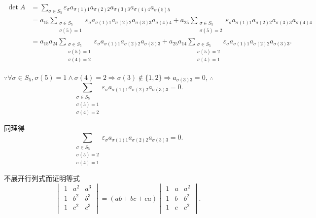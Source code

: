 \documentclass{ctexart}
\begin{document}
\begin{solution}
    \begin{align*}
        \det A & =\sum\limits_{\sigma\in S_5}\varepsilon_\sigma a_{\sigma(1)1}a_{\sigma(2)2}a_{\sigma(3)3}a_{\sigma(4)4}a_{\sigma(5)5} \\
        & =a_{15}\sum\limits_{\substack{\sigma\in S_5\\\sigma(5)=1}}\varepsilon_\sigma a_{\sigma(1)1}a_{\sigma(2)2}a_{\sigma(3)3}a_{\sigma(4)4}+a_{25}\sum\limits_{\substack{\sigma\in S_5\\\sigma(5)=2}}\varepsilon_\sigma a_{\sigma(1)1}a_{\sigma(2)2}a_{\sigma(3)3}a_{\sigma(4)4} \\
        & =a_{15}a_{24}\sum\limits_{\substack{\sigma\in S_5\\\sigma(5)=1\\\sigma(4)=2}}\varepsilon_\sigma a_{\sigma(1)1}a_{\sigma(2)2}a_{\sigma(3)3}+a_{25}a_{14}\sum\limits_{\substack{\sigma\in S_5\\\sigma(5)=2\\\sigma(4)=1}}\varepsilon_\sigma a_{\sigma(1)1}a_{\sigma(2)2}a_{\sigma(3)3}.
    \end{align*}

    $\because\forall\sigma\in S_5,\sigma(5)=1\wedge\sigma(4)=2\Rightarrow\sigma(3)\notin\{1,2\}\Rightarrow a_{\sigma(3)3}=0$, $\therefore$
    \[\sum\limits_{\substack{\sigma\in S_5\\\sigma(5)=1\\\sigma(4)=2}}\varepsilon_\sigma a_{\sigma(1)1}a_{\sigma(2)2}a_{\sigma(3)3}=0.\]

    同理得
    \[\sum\limits_{\substack{\sigma\in S_5\\\sigma(5)=2\\\sigma(4)=1}}\varepsilon_\sigma a_{\sigma(1)1}a_{\sigma(2)2}a_{\sigma(3)3}=0.\]
\end{solution}
\begin{exercisec}[4.2.2(3)]
    不展开行列式而证明等式
    \[\begin{vmatrix}
        1 & a^2 & a^3 \\
        1 & b^2 & b^3 \\
        1 & c^2 & c^3 \\
    \end{vmatrix}=(ab+bc+ca)\begin{vmatrix}
        1 & a & a^2 \\
        1 & b & b^2 \\
        1 & c & c^2 \\
    \end{vmatrix}.\]
\end{exercisec}
\end{document}
